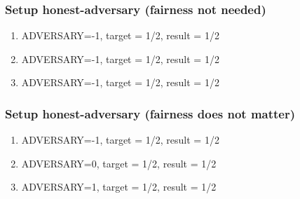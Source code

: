 \documentclass{article}
\begin{document}



\subsubsection{Setup honest-adversary (fairness not needed)}

\begin{enumerate}
\item ADVERSARY=-1, target = 1/2, result = 1/2
\item ADVERSARY=-1, target = 1/2, result = 1/2
\item ADVERSARY=-1, target = 1/2, result = 1/2
\end{enumerate}

\subsubsection{Setup honest-adversary (fairness does not matter)}

\begin{enumerate}
\item ADVERSARY=-1, target = 1/2, result = 1/2
\item ADVERSARY=0, target = 1/2, result = 1/2
\item ADVERSARY=1, target = 1/2, result = 1/2
\end{enumerate}
\end{document}
